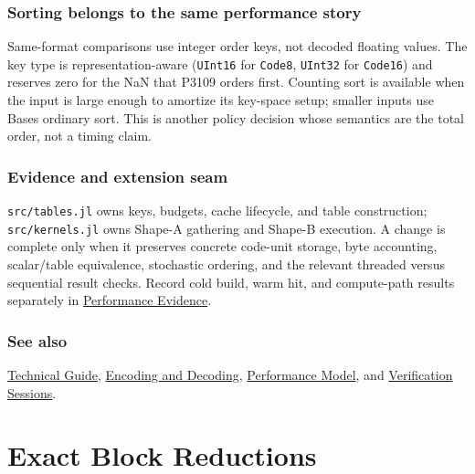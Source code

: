 \subsection{Sorting belongs to the same performance story}



\label{16625131197307808452}{}


Same-format comparisons use integer order keys, not decoded floating values. The key type is representation-aware (\texttt{UInt16} for \texttt{Code8}, \texttt{UInt32} for \texttt{Code16}) and reserves zero for the NaN that P3109 orders first. Counting sort is available when the input is large enough to amortize its key-space setup; smaller inputs use Base{\textquotesingle}s ordinary sort. This is another policy decision whose semantics are the total order, not a timing claim.



\subsection{Evidence and extension seam}



\label{8819019907820115761}{}


\texttt{src/tables.jl} owns keys, budgets, cache lifecycle, and table construction; \texttt{src/kernels.jl} owns Shape-A gathering and Shape-B execution. A change is complete only when it preserves concrete code-unit storage, byte accounting, scalar/table equivalence, stochastic ordering, and the relevant threaded versus sequential result checks. Record cold build, warm hit, and compute-path results separately in \href{examples\_\allowbreak{}performance.md}{Performance Evidence}.



\subsection{See also}



\label{292862844209942199-dup19}{}


\href{technical\_\allowbreak{}guide.md}{Technical Guide}, \href{internals\_\allowbreak{}encoding\_\allowbreak{}decoding.md}{Encoding and Decoding}, \href{concept\_\allowbreak{}performance.md}{Performance Model}, and \href{examples\_\allowbreak{}verification.md}{Verification Sessions}.



\chapter{Exact Block Reductions}


